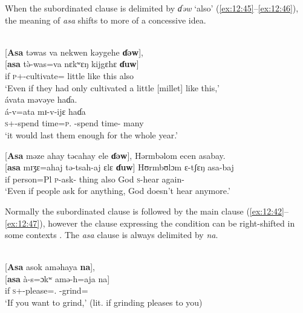 When the subordinated clause is delimited by \textit{ɗəw} ‘also' (\ref{ex:12:45}--\ref{ex:12:46}), the meaning of \textit{asa} shifts to more of a concessive idea.

\ea \label{ex:12:45}
\\
{}[\textbf{Asa} təwas  va  nekwen  kəygehe  \textbf{ɗəw}],\\  
\gll  {}[\textbf{asa}  t\`{ə}-was=va   nɛkʷɛŋ   kijgɛhɛ  \textbf{ɗuw}]\\ 
      if    \textsc{p}+{\PFV}-cultivate={\PRF}  little  {like this}  also \\     
\glt ‘Even if they had only cultivated a little [millet] like this,’\\

\medskip
ávata  məvəye  haɗa.\\
\gll á-v=ata mɪ-v-ijɛ haɗa\\
     \textsc{s}+{\IFV}-{spend time}=\textsc{p}.{\IO}  {\NOM}{}-{spend time}-{\CL}  many\\
\glt  ‘it would last them enough for the whole year.’
\z 

\ea \label{ex:12:46}
{}[\textbf{Asa} məze  ahay  təcahay  ele  \textbf{ɗəw}],  Hərmbəlom  ecen  asabay.\\
\gll  {}[\textbf{asa}  mɪʒɛ=ahaj   tə-tsah-aj  ɛlɛ       \textbf{ɗuw}]   Hʊrmbʊlɔm ɛ-tʃɛŋ asa-baj\\
      if       person=Pl        \textsc{p}-ask{}-{\CL} thing  also  God \textsc{s}-hear again-{\NEG}\\
\glt  ‘Even if people ask for anything, God doesn’t hear anymore.’  
\z 

Normally the subordinated clause is followed by the main clause (\ref{ex:12:42}--\ref{ex:12:47}), however the clause expressing the condition can be right-shifted in some contexts . The \textit{asa} clause is always delimited by \textit{na}.

\clearpage
\ea \label{ex:12:47}
\\
{}[\textbf{Asa}  asok  aməhaya  \textbf{na}], \\ 
\gll  {}[\textbf{asa}   à-s=ɔkʷ  amə-h=aja  na]\\ 
      if  \textsc{s}+{\IFV}-please={\twoS}.{\IO}  {\DEP}-grind={\PLU}  {\PSP}\\ 
\glt ‘If you want to grind,’ (lit. if grinding pleases to you)\\

